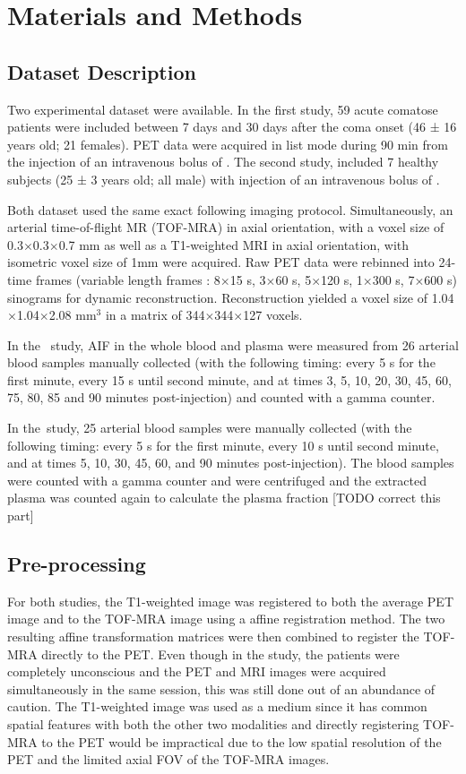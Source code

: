 \chapter{Materials and Methods}

\section{Dataset Description}
Two experimental dataset were available.
In the first study, 59 acute comatose patients were included between 7 days and 30 days after the coma onset (46 ± 16 years old; 21 females).
PET data were acquired in list mode during 90 min from the injection of an intravenous bolus of \fdg.
The second study, included 7 healthy subjects (25 ± 3 years old; all male) with injection of an intravenous bolus of \yohimbine.

Both dataset used the same exact following imaging protocol.
Simultaneously, an arterial time-of-flight MR (TOF-MRA)  in axial orientation, with a voxel size of 0.3$\times$0.3$\times$0.7 mm as well as a T1-weighted MRI in axial orientation, with isometric voxel size of 1mm were acquired.
Raw PET data were rebinned into 24-time frames (variable length frames : 8$\times$15 s, 3$\times$60 s, 5$\times$120 s, 1$\times$300 s, 7$\times$600 s) sinograms for dynamic reconstruction.
Reconstruction yielded a voxel size of 1.04$\times$1.04$\times$2.08 mm$^3$ in a matrix of 344$\times$344$\times$127 voxels.

In the \fdg  $\,$ study, AIF in the whole blood and plasma were measured from 26 arterial blood samples manually collected (with the following timing: every 5 s for the first minute, every 15 s until second minute, and at times 3, 5, 10, 20, 30, 45, 60, 75, 80, 85 and 90 minutes post-injection) and counted with a gamma counter.

In the \yohimbine $\,$study, 25 arterial blood samples were manually collected (with the following timing: every 5 s for the first minute, every 10 s until second minute, and at times 5, 10, 30, 45, 60, and 90 minutes post-injection).
The blood samples were counted with a gamma counter and were centrifuged and the extracted plasma was counted again to calculate the plasma fraction [TODO correct this part]


\section{Pre-processing}
For both studies, the T1-weighted image was registered to both the average PET image and to the TOF-MRA image using a affine registration method.
The two resulting affine transformation matrices were then combined to register the TOF-MRA directly to the PET.
Even though in the \fdg study, the patients were completely unconscious and the PET and MRI images were acquired simultaneously in the same session, this was still done out of an abundance of caution.
The T1-weighted image was used as a medium since it has common spatial features with both the other two modalities and directly registering TOF-MRA to the PET would be impractical due to the low spatial resolution of the PET and the limited axial FOV of the TOF-MRA images.

